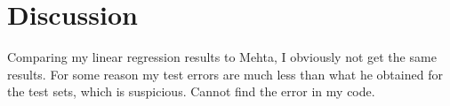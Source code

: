 \section{Discussion} \label{sec:discussion}
Comparing my linear regression results to Mehta, I obviously not get the same results. For some reason my test errors are much less than what he obtained for the test sets, which is suspicious. Cannot find the error in my code. 